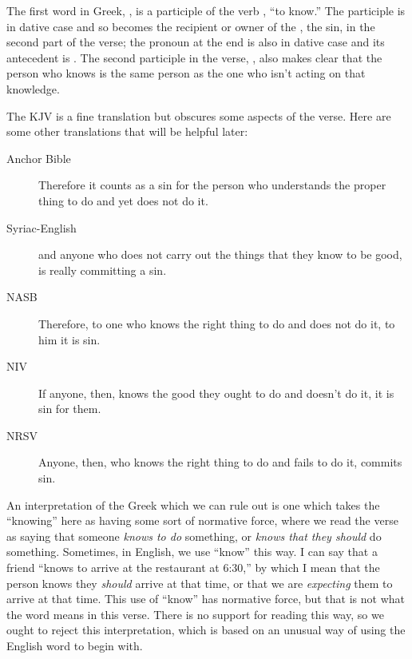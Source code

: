 				The first word in Greek,
					,
						is a participle of the verb ,
							``to know.''
				The participle is in dative case and so becomes the recipient or owner of the ,
					the sin,
						in the second part of the verse;
							the pronoun  at the end is also in dative case and its antecedent is .
				The second participle in the verse,
					,
						also makes clear that the person who knows is the same person as the one who isn't acting on that knowledge.
						
				The KJV is a fine translation but obscures some aspects of the verse.
				Here are some other translations that will be helpful later:
				
					\begin{description}
						\item[Anchor Bible] Therefore it counts as a sin for the person who understands the proper thing to do and yet does not do it.
						\item[Syriac-English] and anyone who does not carry out the things that they know to be good, is really committing a sin.
						\item[NASB] Therefore, to one who knows the right thing to do and does not do it, to him it is sin.
						\item[NIV] If anyone, then, knows the good they ought to do and doesn't do it, it is sin for them.
						\item[NRSV] Anyone, then, who knows the right thing to do and fails to do it, commits sin.
					\end{description}
					
				An interpretation of the Greek which we can rule out is one which takes the ``knowing'' here as having some sort of normative force,
					where we read the verse as saying that someone \textit{knows to do} something,
						or \textit{knows that they should} do something.
				Sometimes,
					in English,
						we use ``know'' this way.
				I can say that a friend ``knows to arrive at the restaurant at 6:30,''
					by which I mean that the person knows they \textit{should} arrive at that time,
						or that we are \textit{expecting} them to arrive at that time.
				This use of ``know'' has normative force,
					but that is not what the word means in this verse.
				There is no support for reading  this way,
					so we ought to reject this interpretation,
						which is based on an unusual way of using the English word to begin with.
						
